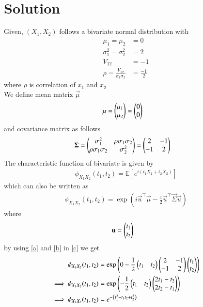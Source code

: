 \documentclass[journal,12pt,twocolumn]{IEEEtran}
\begin{document}
\section*{Solution}
Given, $(X_1,X_2)$ follows a bivariate normal distribution with
\begin{align}
    \mu_1=\mu_2&=0\\
    \sigma^2_1=\sigma^2_2&=2\\
    V_{12}&=-1\\
    \rho=\frac{V_{12}}{\sigma_1\sigma_2}&=\frac{-1}{2}
\end{align}
where $\rho$ is correlation of $x_1$ and $x_2$\\
We define mean matrix $\vec{\mu}$
\begin{align}
    \mathbf{\mu}&=\begin{pmatrix}\mu_1\\
             \mu_2\end{pmatrix}
             =\begin{pmatrix}0\\
             0\end{pmatrix}
             \label{a}
\end{align}
 and covariance matrix \vec{$\Sigma$} as follows
\begin{align}
    \mathbf{\Sigma}&=\begin{pmatrix}\sigma_1^2&\rho\sigma_1\sigma_2\\
                    \rho\sigma_1\sigma_2&\sigma_2^2\end{pmatrix}
                = \begin{pmatrix}2&-1\\
                        -1&2\end{pmatrix}
                \label{b}
\end{align}
The characteristic function of bivariate is given by
\begin{align}
    \phi_{X_1 X_2}(t_1,t_2)=\mathbb{E}[e^{i(t_1X_1+t_2X_2)}]
    \label{c}
\end{align}
which can also be written as
\begin{align}
    \phi_{X_1 X_2}(t_1,t_2)=\exp({i\vec{u}^{\top}\vec{\mu}-\frac{1}{2}\vec{u}^{\top}\vec{\Sigma}\vec{u}})
    \label{d}
\end{align}
where
\begin{align}
    \mathbf{u}&=\begin{pmatrix}t_1\\
                   t_2\end{pmatrix}
\end{align}
by using \eqref{a} and \eqref{b} in \eqref{c} we get
\begin{align}
   \phi_{X_1 X_2}(t_1,t_2)&=\exp\left(0-\frac{1}{2}\begin{pmatrix}t_1&t_2\end{pmatrix}\begin{pmatrix}2&-1\\
                                                         -1&2\end{pmatrix}\begin{pmatrix}t_1\\
                                                                    t_2\end{pmatrix}\right)\\
    \implies \phi_{X_1 X_2}(t_1,t_2)&=\exp\left(-\frac{1}{2}\begin{pmatrix}t_1&t_2\end{pmatrix}\begin{pmatrix}2t_1-t_2\\
                                                         2t_2-t_1\end{pmatrix}\right)\\
    \implies \phi_{X_1 X_2}(t_1,t_2)&=e^{-\left(t_1^2-t_1t_2+t_2^2\right)}
    \label{e}
\end{align}
\end{document}
